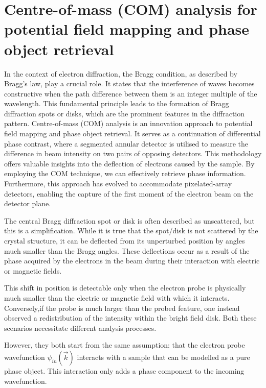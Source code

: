 
\chapter{Centre-of-mass (COM) analysis for potential field mapping and phase object retrieval}
\label{sec:COM}
%
In the context of electron diffraction, the Bragg condition, as described by Bragg's law, play a crucial role. It states that the interference of waves becomes constructive when the path difference between them is an integer multiple of the wavelength. This fundamental principle leads to the formation of Bragg diffraction spots or disks, which are the prominent features in the diffraction pattern.
%
%
Centre-of-mass (COM) analysis is an innovation approach to potential field mapping and phase object retrieval. 
%
It serves as a continuation of differential phase contrast, where a segmented annular detector is utilised to measure the difference in beam intensity on two pairs of opposing detectors. 
%
This methodology offers valuable insights into the deflection of electrons caused by the sample. 
%
By employing the COM technique, we can effectively  retrieve phase information. 
%
Furthermore, this approach has evolved to accommodate pixelated-array detectors, enabling the capture of the first moment of the electron beam on the detector plane. 

The central Bragg diffraction spot or disk is often described as unscattered, but this is a simplification. 
%
While it is true that the spot/disk is not scattered by the crystal structure, it can be deflected from its  unperturbed position by angles much smaller than the Bragg angles. 
%
These deflections occur as a result of the phase acquired by the electrons in the beam during their interaction with electric or magnetic fields.

This shift in position is detectable only when the electron probe is physically much smaller than the electric or magnetic field with which it interacts.
%
Conversely,if the probe is much larger than the probed feature, one instead observed a redistribution of the intensity within the bright field disk.
%
Both these scenarios necessitate different analysis processes.

However, they both start from the same assumption: that the electron probe wavefunction $\psi_{in}(\vec{k})$ interacts with a sample that can be modelled as a pure phase object. This interaction only adds a phase component to the incoming wavefunction\cite{caoTheoryPracticeElectron2018, lazicPhaseContrastSTEM2016}. 

